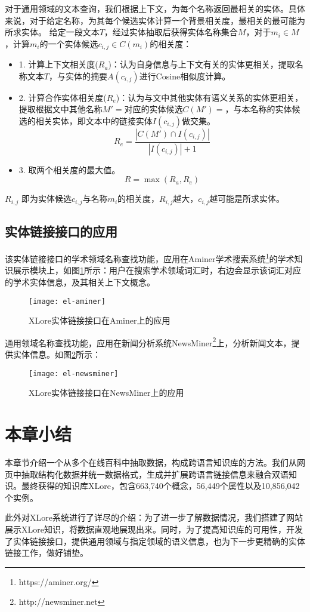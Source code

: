 对于通用领域的文本查询，我们根据上下文，为每个名称返回最相关的实体。具体来说，对于给定名称，为其每个候选实体计算一个背景相关度，最相关的最可能为所求实体。
给定一段文本$T$，经过实体抽取后获得实体名称集合$M$，对于$m_i \in M$，计算$m_i$的一个实体候选$c_{i,j} \in C(m_i)$的相关度：
\begin{itemize}
\item 1.  计算上下文相关度($R_a$)：认为自身信息与上下文有关的实体更相关，提取名称文本$T$，与实体的摘要$A(c_{i,j})$进行Cosine相似度计算。

\item 2.  计算合作实体相关度($R_e$)：认为与文中其他实体有语义关系的实体更相关，提取根据文中其他名称$M'=$对应的实体候选$C(M') = $，与本名称的实体候选的相关实体，即文本中的链接实体$I(c_{i,j})$做交集。
\begin{equation}
{ R }_{ e }=\frac { \left| C\left( M' \right) \cap I\left( { c }_{ i,j } \right)  \right|  }{ \left| I\left( { c }_{ i,j } \right)  \right| +1 }
\end{equation}

\item 3.  取两个相关度的最大值。
\begin{equation}
R = \max{ \left(R_a, R_e \right)}
\end{equation}
\end{itemize}
$R_{i,j}$ 即为实体候选$c_{i,j}$与名称$m_i$的相关度，$R_{i,j}$越大，$c_{i,j}$越可能是所求实体。

\subsection{实体链接接口的应用}
该实体链接接口的学术领域名称查找功能，应用在Aminer学术搜索系统\footnote{https://aminer.org/}的学术知识展示模块上，如图\ref{fig:el-aminer}所示：用户在搜索学术领域词汇时，右边会显示该词汇对应的学术实体信息，及其相关上下文概念。
\begin{figure}[H]
  \centering
  \texttt{[image: el-aminer]}
  \caption{XLore实体链接接口在Aminer上的应用}
  \label{fig:el-aminer}
\end{figure}

通用领域名称查找功能，应用在新闻分析系统NewsMiner\footnote{http://newsminer.net}上，分析新闻文本，提供实体信息。如图\ref{fig:el-newsminer}所示：
\begin{figure}[H]
  \centering
  \texttt{[image: el-newsminer]}
  \caption{XLore实体链接接口在NewsMiner上的应用}
  \label{fig:el-newsminer}
\end{figure}

\section{本章小结}
本章节介绍一个从多个在线百科中抽取数据，构成跨语言知识库的方法。我们从网页中抽取结构化数据并统一数据格式，生成并扩展跨语言链接信息来融合双语知识。最终获得的知识库XLore，包含663,740个概念，56,449个属性以及10,856,042个实例。

此外对XLore系统进行了详尽的介绍：为了进一步了解数据情况，我们搭建了网站展示XLore知识，将数据直观地展现出来。同时，为了提高知识库的可用性，开发了实体链接接口，提供通用领域与指定领域的语义信息，也为下一步更精确的实体链接工作，做好铺垫。

